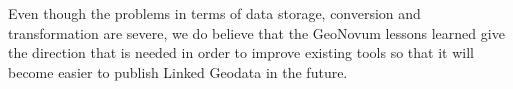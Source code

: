 \documentclass[a4paper]{scrartcl}
\newcommand{\textt}[1]{{\small \texttt{#1}}}
\begin{document}
Even though the problems in terms of data storage, conversion and
transformation are severe, we do believe that the GeoNovum lessons
learned give the direction that is needed in order to improve existing
tools so that it will become easier to publish Linked Geodata in the
future.

  
\end{document}
